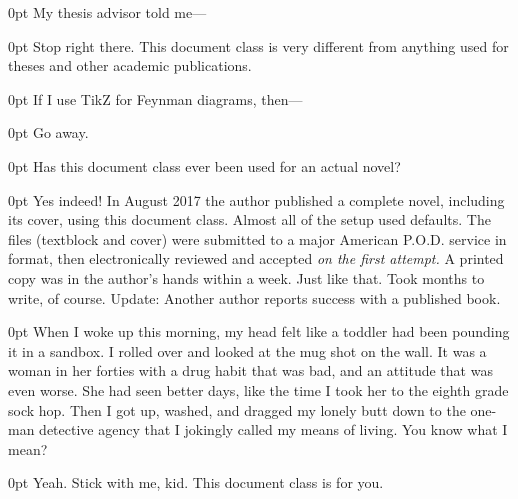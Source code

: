 \documentclass{novel} %
\begin{document}
\begin{adjustwidth}{\parindent}{0pt}
\backindent{}My thesis advisor told me---
\end{adjustwidth}
\begin{adjustwidth}{\parindent}{0pt}
\backindent{}Stop right there. This document class is very different from anything used for theses and other academic publications.
\end{adjustwidth}

\begin{adjustwidth}{\parindent}{0pt}
\backindent{}If I use TikZ for Feynman diagrams, then---
\end{adjustwidth}
\begin{adjustwidth}{\parindent}{0pt}
\backindent{}Go away.
\end{adjustwidth}

\begin{adjustwidth}{\parindent}{0pt}
\backindent{}Has this document class ever been used for an actual novel?
\end{adjustwidth}
\begin{adjustwidth}{\parindent}{0pt}
\backindent{}Yes indeed! In August 2017 the author published a complete novel, including its cover, using this document class. Almost all of the setup used defaults. The files (textblock and cover) were submitted to a major American P.O.D. service in  format, then electronically reviewed and accepted \textit{on the first attempt.} A printed copy was in the author's hands within a week. Just like that. Took months to write, of course. Update: Another author reports success with a published book.
\end{adjustwidth}

\begin{adjustwidth}{\parindent}{0pt}
\backindent{}When I woke up this morning, my head felt like a toddler had been pounding it in a sandbox. I rolled over and looked at the mug shot on the wall. It was a woman in her forties with a drug habit that was bad, and an attitude that was even worse. She had seen better days, like the time I took her to the eighth grade sock hop. Then I got up, washed, and dragged my lonely butt down to the one-man detective agency that I jokingly called my means of living. You know what I mean?
\end{adjustwidth}
\begin{adjustwidth}{\parindent}{0pt}
\backindent{}Yeah. Stick with me, kid. This document class is for you.
\end{adjustwidth}
\end{document}

